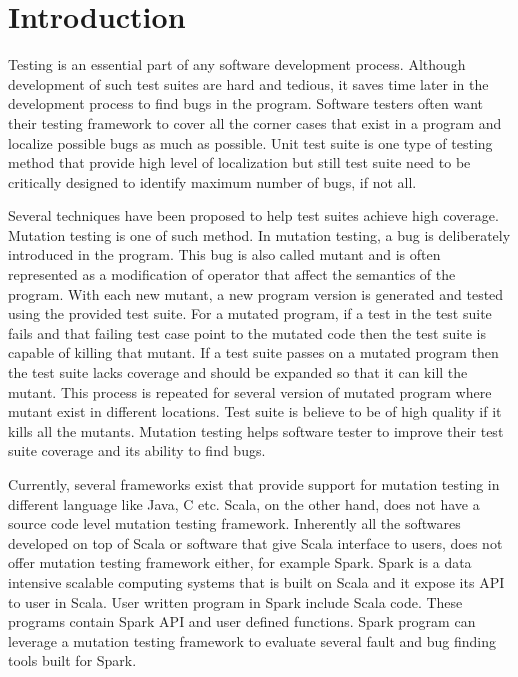 \section{Introduction}

Testing is an essential part of any software development process. Although development of such test suites are hard and tedious, it saves time later in the development process to find bugs in the program. Software testers often want their testing framework to cover all the corner cases that exist in a program and localize possible bugs as much as possible. Unit test suite is one type of testing method that provide high level of localization but still test suite need to be critically designed to identify maximum number of bugs, if not all. 

Several techniques have been proposed to help test suites achieve high coverage. Mutation testing is one of such method. In mutation testing, a bug is deliberately introduced in the program. This bug is also called mutant and is often represented as a modification of operator that affect the semantics of the program. With each new mutant, a new program version is generated and tested using the provided test suite. For a mutated program, if a test in the test suite fails and that failing test case point to the mutated code then the test suite is capable of killing that mutant. If a test suite passes on a mutated program then the test suite lacks coverage and should be expanded so that it can kill the mutant.  This process is repeated for several version of mutated program where mutant exist in different locations. Test suite is believe to be of high quality if it kills all the mutants. Mutation testing helps software tester to improve their test suite coverage and its ability to find bugs.

Currently, several frameworks exist that provide support for mutation testing in different language like Java, C etc. Scala, on the other hand, does not have a source code level mutation testing framework. Inherently all the softwares developed on top of Scala or software that give Scala interface to users, does not offer mutation testing framework either, for example Spark. Spark is a data intensive scalable computing systems that is built on Scala and it expose its API to user in Scala. User written program in Spark include Scala code. These programs contain Spark API and user defined functions. Spark program can leverage a mutation testing framework to evaluate several fault and bug finding tools built for Spark.  

